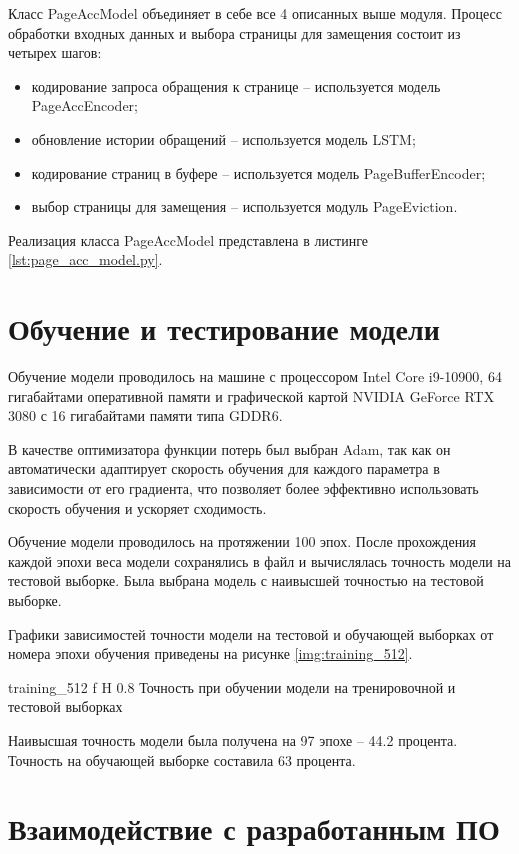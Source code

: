 Класс PageAccModel объединяет в себе все 4 описанных выше модуля.
Процесс обработки входных данных и выбора страницы для замещения состоит из четырех шагов:
\begin{itemize}
	\item кодирование запроса обращения к странице -- используется модель PageAccEncoder;
	\item обновление истории обращений -- используется модель LSTM;
	\item кодирование страниц в буфере -- используется модель PageBufferEncoder;
	\item выбор страницы для замещения -- используется модуль PageEviction.
\end{itemize}
Реализация класса PageAccModel представлена в листинге \ref{lst:page_acc_model.py}.

\section{Обучение и тестирование модели}

Обучение модели проводилось на машине с процессором Intel Core i9-10900, 64 гигабайтами оперативной памяти и графической картой NVIDIA GeForce RTX 3080 с 16 гигабайтами памяти типа GDDR6.

В качестве оптимизатора функции потерь был выбран Adam, так как он автоматически адаптирует скорость обучения для каждого параметра в зависимости от его градиента, что позволяет более эффективно использовать скорость обучения и ускоряет сходимость.

Обучение модели проводилось на протяжении 100 эпох.
После прохождения каждой эпохи веса модели сохранялись в файл и вычислялась точность модели на тестовой выборке.
Была выбрана модель с наивысшей точностью на тестовой выборке.

Графики зависимостей точности модели на тестовой и обучающей выборках от номера эпохи обучения приведены на рисунке \ref{img:training_512}.

{training_512} %
{f} %
{H} %
{0.8\textwidth} %
{Точность при обучении модели на тренировочной и тестовой выборках} %

Наивысшая точность модели была получена на 97 эпохе -- 44.2 процента.
Точность на обучающей выборке составила 63 процента.

\section{Взаимодействие с разработанным ПО}

